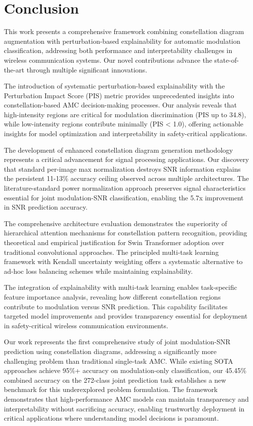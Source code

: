 \documentclass{ELSP}
\begin{document}
{{\section{Conclusion}

This work presents a comprehensive framework combining constellation diagram augmentation with perturbation-based explainability for automatic modulation classification, addressing both performance and interpretability challenges in wireless communication systems. Our novel contributions advance the state-of-the-art through multiple significant innovations.

The introduction of systematic perturbation-based explainability with the Perturbation Impact Score (PIS) metric provides unprecedented insights into constellation-based AMC decision-making processes. Our analysis reveals that high-intensity regions are critical for modulation discrimination (PIS up to 34.8), while low-intensity regions contribute minimally (PIS < 1.0), offering actionable insights for model optimization and interpretability in safety-critical applications.

The development of enhanced constellation diagram generation methodology represents a critical advancement for signal processing applications. Our discovery that standard per-image max normalization destroys SNR information explains the persistent 11-13\% accuracy ceiling observed across multiple architectures. The literature-standard power normalization approach preserves signal characteristics essential for joint modulation-SNR classification, enabling the 5.7x improvement in SNR prediction accuracy.

The comprehensive architecture evaluation demonstrates the superiority of hierarchical attention mechanisms for constellation pattern recognition, providing theoretical and empirical justification for Swin Transformer adoption over traditional convolutional approaches. The principled multi-task learning framework with Kendall uncertainty weighting offers a systematic alternative to ad-hoc loss balancing schemes while maintaining explainability.

The integration of explainability with multi-task learning enables task-specific feature importance analysis, revealing how different constellation regions contribute to modulation versus SNR prediction. This capability facilitates targeted model improvements and provides transparency essential for deployment in safety-critical wireless communication environments.

Our work represents the first comprehensive study of joint modulation-SNR prediction using constellation diagrams, addressing a significantly more challenging problem than traditional single-task AMC. While existing SOTA approaches achieve 95\%+ accuracy on modulation-only classification, our 45.45\% combined accuracy on the 272-class joint prediction task establishes a new benchmark for this underexplored problem formulation. The framework demonstrates that high-performance AMC models can maintain transparency and interpretability without sacrificing accuracy, enabling trustworthy deployment in critical applications where understanding model decisions is paramount.

}}
\end{document}
